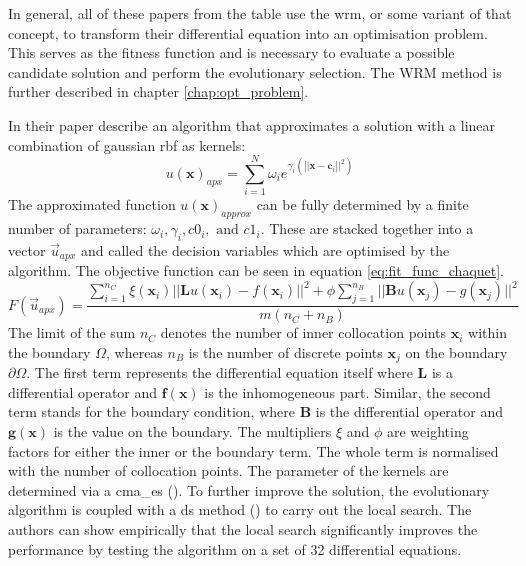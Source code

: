 \documentclass[./\jobname.tex,hidelinks]{subfiles}
\begin{document}
In general, all of these papers from the table use the \gls{wrm}, or some variant of that concept, to transform their differential equation into an optimisation problem. This serves as the fitness function and is necessary to evaluate a possible candidate solution and perform the evolutionary selection. The WRM method is further described in chapter \ref{chap:opt_problem}.

In their paper \cite{chaquet_using_2019} describe an algorithm that approximates a solution with a linear combination of gaussian \gls{rbf} as kernels:
\begin{equation}
	u(\mathbf{x})_{apx} = \sum_{i=1}^{N} \omega_i e^{\gamma_i (\left||\mathbf{x} - \mathbf{c}_i\right||^2)}
\end{equation}
The approximated function $u(\mathbf{x})_{approx}$ can be fully determined by a finite number of parameters: $\omega_i, \gamma_i, c0_i, \text{ and } c1_i$. These are stacked together into a vector $\vec{u}_{apx}$ and called the decision variables which are optimised by the algorithm. 
The objective function can be seen in equation \ref{eq:fit_func_chaquet}. 
\begin{equation}
\label{eq:fit_func_chaquet}
F(\vec{u}_{apx}) = \frac{\sum_{i=1}^{n_C} \xi (\mathbf{x}_i) || \mathbf{L}u(\mathbf{x}_i) - f(\mathbf{x}_i)||^2 + \phi \sum_{j=1}^{n_B} || \mathbf{B}u(\mathbf{x}_j) - g(\mathbf{x}_j)||^2}{m (n_C + n_B)}  
\end{equation}
The limit of the sum $n_C$ denotes the number of inner collocation points $\mathbf{x}_i$ within the boundary $\Omega$, whereas $n_B$ is the number of discrete points $\mathbf{x}_j$ on the boundary $\partial \Omega$. The first term represents the differential equation itself where $\mathbf{L}$ is a differential operator and $\mathbf{f}(\mathbf{x})$ is the inhomogeneous part. Similar, the second term stands for the boundary condition, where $\mathbf{B}$ is the differential operator and $\mathbf{g}(\mathbf{x})$ is the value on the boundary. The multipliers $\xi$ and $\phi$ are weighting factors for either the inner or the boundary term. The whole term is normalised with the number of collocation points. 
The parameter of the kernels are determined via a \gls{cma_es} (\cite{hansen_cma_2006}). To further improve the solution, the evolutionary algorithm is coupled with a \gls{ds} method (\cite{nelder_simplex_1965}) to carry out the local search. The authors can show empirically that the local search significantly improves the performance by testing the algorithm on a set of 32 differential equations. 
\end{document}
